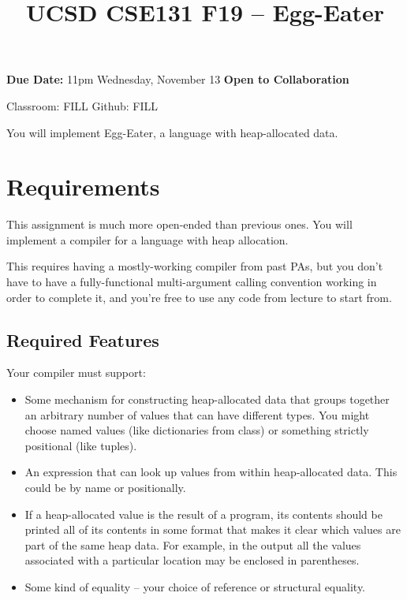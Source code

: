 \documentclass[10pt, oneside]{article}
\title{UCSD CSE131 F19 -- Egg-Eater}
\begin{document}
\maketitle 

{\bf Due Date:} 11pm Wednesday, November 13 \hspace{2em} {\bf Open to Collaboration}

Classroom: FILL \hspace{1em} Github: FILL

You will implement Egg-Eater, a language with heap-allocated data.

\section*{Requirements}

This assignment is much more open-ended than previous ones. You will
implement a compiler for a language with heap allocation.

This requires having a mostly-working compiler from past PAs, but you don't
have to have a fully-functional multi-argument calling convention working in
order to complete it, and you're free to use any code from lecture to start
from.

\subsection*{Required Features}

Your compiler must support:

\begin{itemize}

\item Some mechanism for constructing heap-allocated data that groups
together an arbitrary number of values that can have different types. You
might choose named values (like dictionaries from class) or something
strictly positional (like tuples).

\item An expression that can look up values from within heap-allocated data.
This could be by name or positionally.

\item If a heap-allocated value is the result of a program, its contents
should be printed all of its contents in some format that makes it clear
which values are part of the same heap data. For example, in the output all
the values associated with a particular location may be enclosed in
parentheses.

\item Some kind of equality -- your choice of reference or structural equality.
\end{itemize}
\end{document}
